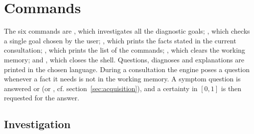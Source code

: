 \section{Commands}

The six commands are , which investigates all the
diagnostic goals; , which checks a single goal chosen by the user;
, which prints the facts stated in the current consultation;
, which prints the list of the commands; , which clears the
working memory; and , which closes the shell. Questions, diagnoses
and explanations are printed in the chosen language. During a consultation the
engine poses a question whenever a fact it needs is not in the working memory.
A symptom question is answered  or  (or , cf.
section~\ref{sec:acquisition}), and a certainty in $[0,1]$ is then requested
for the answer.

\subsection{Investigation}

